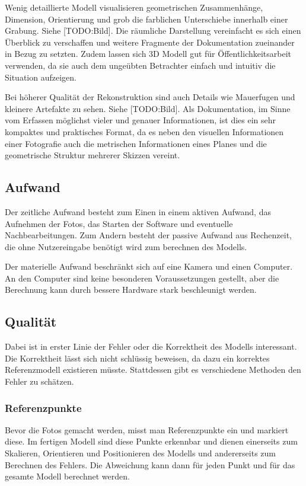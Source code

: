 			Wenig detaillierte Modell visualisieren geometrischen Zusammenhänge, Dimension, Orientierung und grob die farblichen Unterschiebe innerhalb einer Grabung. Siehe [TODO:Bild]. Die räumliche Darstellung vereinfacht es sich einen Überblick zu verschaffen und weitere Fragmente der Dokumentation zueinander in Bezug zu setzten.
			Zudem lassen sich 3D Modell gut für Öffentlichkeitsarbeit verwenden, da sie auch dem ungeübten Betrachter einfach und intuitiv die Situation aufzeigen.
			
			Bei höherer Qualität der Rekonstruktion sind auch Details wie Mauerfugen und kleinere Artefakte zu sehen. Siehe [TODO:Bild]. Als Dokumentation, im Sinne vom Erfassen möglichst vieler und genauer Informationen, ist dies ein sehr kompaktes und praktisches Format, da es neben den visuellen Informationen einer Fotografie auch die metrischen Informationen eines Planes und die geometrische Struktur mehrerer Skizzen vereint. 
			
		\subsection{Aufwand}
			Der zeitliche Aufwand besteht zum Einen in einem aktiven Aufwand, das Aufnehmen der Fotos, das Starten der Software und eventuelle Nachbearbeitungen. Zum Andern besteht der passive Aufwand aus Rechenzeit, die ohne Nutzereingabe benötigt wird zum berechnen des Modells.
			
			Der materielle Aufwand beschränkt sich auf eine Kamera und einen Computer. An den Computer sind keine besonderen Voraussetzungen gestellt, aber die Berechnung kann durch bessere Hardware stark beschleunigt werden.

		\subsection{Qualität}
			Dabei ist in erster Linie der Fehler oder die Korrektheit des Modells interessant. Die Korrektheit lässt sich nicht schlüssig beweisen, da dazu ein korrektes Referenzmodell existieren müsste.
			Stattdessen gibt es verschiedene Methoden den Fehler zu schätzen.
			
			\subsubsection{Referenzpunkte}
				Bevor die Fotos gemacht werden, misst man Referenzpunkte ein und markiert diese. Im fertigen Modell sind diese Punkte erkennbar und dienen einerseits zum Skalieren, Orientieren und Positionieren des Modells und andererseits zum Berechnen des Fehlers. Die Abweichung kann dann für jeden Punkt und für das gesamte Modell berechnet werden.
				
